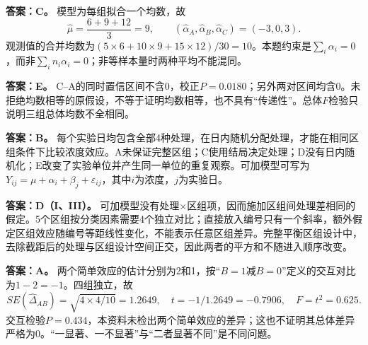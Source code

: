 \textbf{答案：C。} 模型为每组拟合一个均数，故
\[
\widehat\mu=\frac{6+9+12}{3}=9,\qquad
(\widehat\alpha_A,\widehat\alpha_B,\widehat\alpha_C)=(-3,0,3).
\]
观测值的合并均数为\((5\times6+10\times9+15\times12)/30=10\)。本题约束是\(\sum_i\alpha_i=0\)，而非\(\sum_i n_i\alpha_i=0\)；非等样本量时两种平均不能混同。
\par\nobreak\smallskip{}

\textbf{答案：E。} C--A的同时置信区间不含0，校正\(P=0.0180\)；另外两对区间均含0。未拒绝均数相等的原假设，不等于证明均数相等，也不具有“传递性”。总体\(F\)检验只说明三组总体均数不全相同。
\par\nobreak\smallskip{}

\textbf{答案：B。} 每个实验日均包含全部4种处理，在日内随机分配处理，才能在相同区组条件下比较浓度效应。A未保证完整区组；C使用结局决定处理；D没有日内随机化；E改变了实验单位并产生同一单位的重复观察。可加模型可写为\(Y_{ij}=\mu+\alpha_i+\beta_j+\varepsilon_{ij}\)，其中\(i\)为浓度，\(j\)为实验日。
\par\nobreak\smallskip{}

\textbf{答案：D（I、III）。} 可加模型没有处理\(\times\)区组项，因而施加区组间处理差相同的假定。5个区组按分类因素需要4个独立对比；直接放入编号只有一个斜率，额外假定区组效应随编号等距线性变化，不能表示任意区组差异。完整平衡区组设计中，去除截距后的处理与区组设计空间正交，因此两者的平方和不随进入顺序改变。
\par\nobreak\smallskip{}

\textbf{答案：A。} 两个简单效应的估计分别为2和1，按“\(B=1\)减\(B=0\)”定义的交互对比为\(1-2=-1\)。四组独立，故
\[
SE(\widehat\Delta_{AB})=\sqrt{4\times4/10}=1.2649,\quad
t=-1/1.2649=-0.7906,\quad F=t^2=0.625.
\]
交互检验\(P=0.434\)，本资料未检出两个简单效应的差异；这也不证明其总体差异严格为0。“一显著、一不显著”与“二者显著不同”是不同问题。
\par\nobreak\smallskip{}

